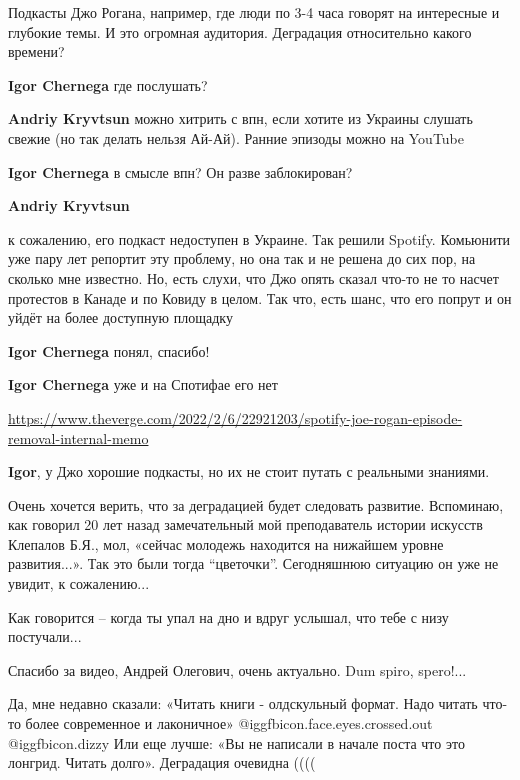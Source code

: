 \begin{itemize}

Подкасты Джо Рогана, например, где люди по 3-4 часа говорят на интересные и
глубокие темы. И это огромная аудитория. Деградация относительно какого
времени?

\begin{itemize} %
\textbf{Igor Chernega} где послушать?

\textbf{Andriy Kryvtsun} можно хитрить с впн, если хотите из Украины слушать свежие (но так делать нельзя Ай-Ай). Ранние эпизоды можно на YouTube

\textbf{Igor Chernega} в смысле впн? Он разве заблокирован?

\textbf{Andriy Kryvtsun} 

к сожалению, его подкаст недоступен в Украине. Так решили Spotify. Комьюнити
уже пару лет репортит эту проблему, но она так и не решена до сих пор, на
сколько мне известно. Но, есть слухи, что Джо опять сказал что-то не то насчет
протестов в Канаде и по Ковиду в целом. Так что, есть шанс, что его попрут и он
уйдёт на более доступную площадку

\textbf{Igor Chernega} понял, спасибо!

\textbf{Igor Chernega} уже и на Спотифае его нет

\url{https://www.theverge.com/2022/2/6/22921203/spotify-joe-rogan-episode-removal-internal-memo}

\textbf{Igor}, у Джо хорошие подкасты, но их не стоит путать с реальными знаниями.

\end{itemize} %


Очень хочется верить, что за деградацией будет следовать развитие. Вспоминаю,
как говорил 20 лет назад замечательный мой преподаватель истории искусств
Клепалов Б.Я., мол, «сейчас молодежь находится на нижайшем уровне развития...».
Так это были тогда \enquote{цветочки}. Сегодняшнюю ситуацию он уже не увидит, к
сожалению...

Как говорится – когда ты упал на дно и вдруг услышал, что тебе с низу
постучали...

Спасибо за видео, Андрей Олегович, очень актуально. Dum spiro, spero!...


Да, мне недавно сказали: «Читать книги - олдскульный формат. Надо читать что-то
более современное и лаконичное»  @igg{fbicon.face.eyes.crossed.out}
@igg{fbicon.dizzy}  Или еще лучше: «Вы не написали в начале поста что это
лонгрид. Читать долго». Деградация очевидна ((((

\end{itemize} %
